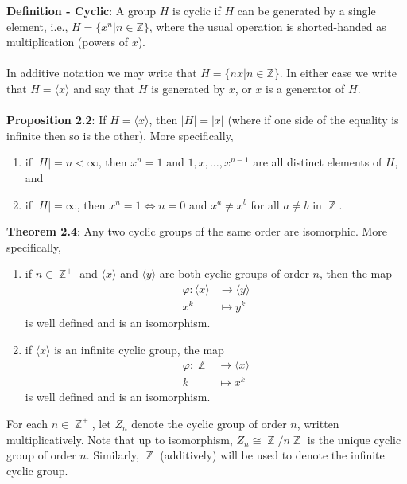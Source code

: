 \documentclass{article}
\DeclareMathOperator{\Z}{\mathbb{Z}}
\begin{document}
\textbf{Definition - Cyclic}: A group $H$ is cyclic if $H$ can be generated by a single element, i.e., $H = \{x^n | n \in \mathbb{Z}\}$, where the usual operation is shorted-handed as multiplication (powers of $x$). \\ \\
In additive notation we may write that $H = \{nx | n \in \mathbb{Z}\}$. In either case we write that $H = \langle x \rangle$ and say that $H$ is generated by $x$, or $x$ is a generator of $H$. \\ \\
\textbf{Proposition 2.2}: If $H = \langle x \rangle$, then $|H| = |x|$ (where if one side of the equality is infinite then so is the other). More specifically, \begin{enumerate}
    \item if $|H| = n < \infty$, then $x^n = 1$ and $1, x, \dots, x^{n - 1}$ are all distinct elements of $H$, and
    \item if $|H| = \infty$, then $x^n = 1 \iff n = 0$ and $x^a \neq x^b$ for all $a \neq b$ in $\Z$.
\end{enumerate} $ $ \\
\textbf{Theorem 2.4}: Any two cyclic groups of the same order are isomorphic. More specifically, \begin{enumerate}
    \item if $n \in \Z^+$ and $\langle x \rangle$ and $\langle y \rangle$ are both cyclic groups of order $n$, then the map \begin{align*}
        \varphi: \langle x \rangle &\rightarrow \langle y \rangle \\
        x^k &\mapsto y^k
    \end{align*}
    is well defined and is an isomorphism.
    \item if $\langle x \rangle$ is an infinite cyclic group, the map \begin{align*}
        \varphi: \Z &\rightarrow \langle x \rangle \\
        k &\mapsto x^k
    \end{align*}
    is well defined and is an isomorphism.
\end{enumerate} $ $ \\
For each $n \in \Z^+$, let $Z_n$ denote the cyclic group of order $n$, written multiplicatively. Note that up to isomorphism, $Z_n \cong \Z/n\Z$ is the unique cyclic group of order $n$. Similarly, $\Z$ (additively) will be used to denote the infinite cyclic group. \\ \\
\end{document}
